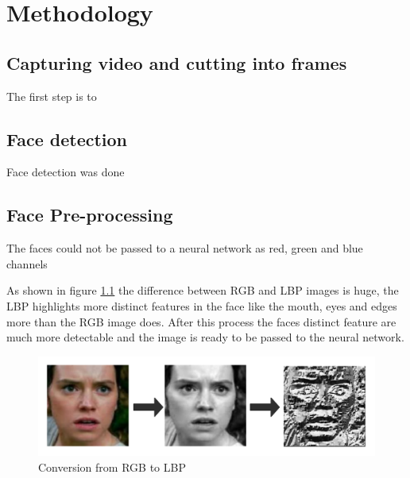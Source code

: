 \chapter{Methodology}
\label{chap:Three}

\section{Capturing video and cutting into frames}
The first step is to 


\section{Face detection}
Face detection was done 

\section{Face Pre-processing}
The faces could not be passed to a neural network as red, green and blue channels 

As shown in figure \ref{figure:Faces} the difference between RGB and LBP images is huge, the LBP highlights more distinct features in the face like the mouth, eyes and edges more than the RGB image does.  After this process the faces distinct feature are much more detectable and the image is ready to be passed to the neural network.
 \par
 \begin{figure}[H]
\centering
\includegraphics[width=15cm]{Figures/faces.png}
\caption{Conversion from RGB to LBP }
\label{figure:Faces}
\end{figure}

